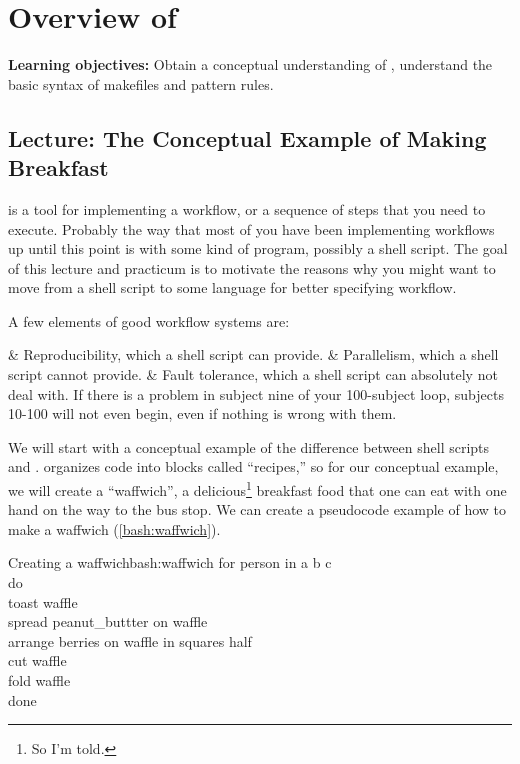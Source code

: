 \chapter{Overview of \maken{}}
\label{practicum1}

\textbf{Learning objectives:} Obtain a conceptual understanding of \maken{}, understand the basic syntax of makefiles and pattern rules.

\section{Lecture: The Conceptual Example of Making Breakfast}

\maken{} is a tool for implementing a workflow, or a sequence of steps that you need to execute. Probably the way that most of you have been implementing workflows up until this point is with some kind of program, possibly a shell script. The goal of this lecture and practicum is to motivate the reasons why you might want to move from a shell script to some language for better specifying workflow.

A few elements of good workflow systems are:
\begin{easylist}[itemize]
	& Reproducibility, which a shell script can provide.
	& Parallelism, which a shell script cannot provide.
	& Fault tolerance, which a shell script can absolutely not deal with. If there is a problem in subject nine of your 100-subject loop, subjects 10-100 will not even begin, even if nothing is wrong with them.
\end{easylist}

We will start with a conceptual example of the difference between
shell scripts and \maken{}. \maken{}  organizes code into blocks called ``recipes,'' so for our conceptual example, we will create a ``waffwich'', a delicious\footnote{So I'm told.} breakfast food that one can eat with one hand on the way to the bus stop. We can create a pseudocode   example of how to make a waffwich (\autoref{bash:waffwich}).
\begin{bash}{Creating a waffwich}{bash:waffwich}
	for person in a b c \\
	do \\
	toast waffle \\
	spread peanut_buttter \dd on waffle \\
	arrange berries \dd on waffle \dd in squares \dd half \\
	cut waffle \\ 
	fold waffle \\
	done
\end{bash}

